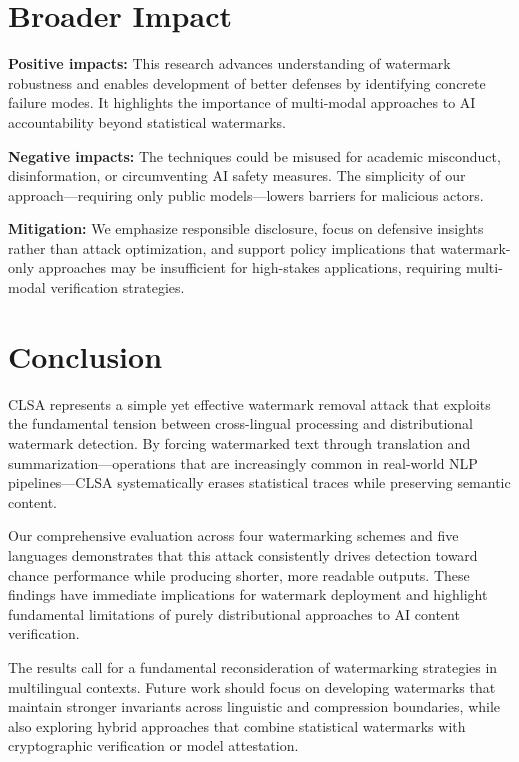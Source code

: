 \documentclass{article}
\begin{document}
\section{Broader Impact}

\textbf{Positive impacts:} This research advances understanding of watermark robustness and enables development of better defenses by identifying concrete failure modes. It highlights the importance of multi-modal approaches to AI accountability beyond statistical watermarks.

\textbf{Negative impacts:} The techniques could be misused for academic misconduct, disinformation, or circumventing AI safety measures. The simplicity of our approach—requiring only public models—lowers barriers for malicious actors.

\textbf{Mitigation:} We emphasize responsible disclosure, focus on defensive insights rather than attack optimization, and support policy implications that watermark-only approaches may be insufficient for high-stakes applications, requiring multi-modal verification strategies.

\section{Conclusion}

CLSA represents a simple yet effective watermark removal attack that exploits the fundamental tension between cross-lingual processing and distributional watermark detection. By forcing watermarked text through translation and summarization—operations that are increasingly common in real-world NLP pipelines—CLSA systematically erases statistical traces while preserving semantic content.

Our comprehensive evaluation across four watermarking schemes and five languages demonstrates that this attack consistently drives detection toward chance performance while producing shorter, more readable outputs. These findings have immediate implications for watermark deployment and highlight fundamental limitations of purely distributional approaches to AI content verification.

The results call for a fundamental reconsideration of watermarking strategies in multilingual contexts. Future work should focus on developing watermarks that maintain stronger invariants across linguistic and compression boundaries, while also exploring hybrid approaches that combine statistical watermarks with cryptographic verification or model attestation.
\end{document}

